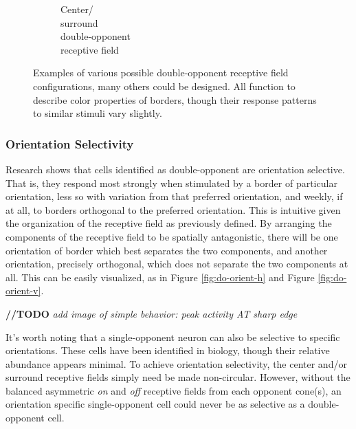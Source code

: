 \documentclass[journal,onecolumn]{IEEEtran}
\begin{document}
\begin{figure}[h]
\begin{subfigure}{0.3\textwidth}
        \caption{Center/ \\ surround \\ double-opponent \\ receptive field}
    \end{subfigure}%
    \caption{Examples of various possible double-opponent receptive field configurations, many others could be designed. All function to describe color properties of borders, though their response patterns to similar stimuli vary slightly.}
    \label{fig:do-rf-schematic}
\end{figure}


\subsubsection*{Orientation Selectivity}

Research shows that cells identified as double-opponent are orientation selective. That is, they respond most strongly when stimulated by a border of particular orientation, less so with variation from that preferred orientation, and weekly, if at all, to borders orthogonal to the preferred orientation. This is intuitive given the organization of the receptive field as previously defined. By arranging the components of the receptive field to be spatially antagonistic, there will be one orientation of border which best separates the two components, and another orientation, precisely orthogonal, which does not separate the two components at all. This can be easily visualized, as in Figure \ref{fig:do-orient-h} and Figure \ref{fig:do-orient-v}.

\textbf{//TODO} \textit{add image of simple behavior: peak activity AT sharp edge}

It's worth noting that a single-opponent neuron can also be selective to specific orientations. These cells have been identified in biology, though their relative abundance appears minimal. To achieve orientation selectivity, the center and/or surround receptive fields simply need be made non-circular. However, without the balanced asymmetric \textit{on} and \textit{off} receptive fields from each opponent cone(s), an orientation specific single-opponent cell could never be as selective as a double-opponent cell.
\end{document}
